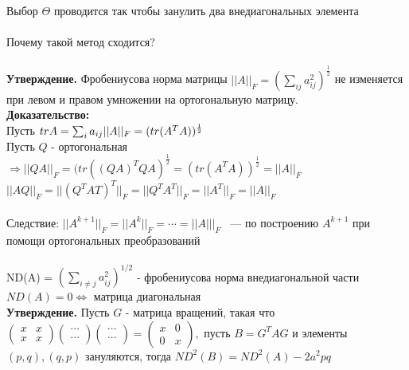     Выбор $\Theta$ проводится так чтобы занулить два внедиагональных элемента\\
    \\ 
    Почему такой метод сходится?\\ \\ 
\textbf{Утверждение.} Фробениусова норма матрицы \(||A||_F = (\sum_{ij}a_{ij}^2)^{\frac{1}{2}}\) не изменяется при левом и правом умножении на ортогональную матрицу. \\
    
    \textbf{Доказательство:} \\
    Пусть \(tr A = \sum_ia_{ij}\\
    ||A||_F = (tr(A^TA))^{\frac{1}{2}}\) \\
    Пусть \(Q\) - ортогональная \(\Rightarrow ||QA||_F=(tr((QA)^TQA)^{\frac{1}{2}} = (tr(A^TA))^{\frac{1}{2}} = ||A||_F\) \\
    \(||AQ||_F = ||(Q^{T}A{T})^{T}||_{F} = ||Q^{T}A^{T}||_{F} = ||A^{T}||_{F} = ||A||_F\) \\
    \\
    Следствие: \(||A^{k+1}||_F=||A^k||_F=\cdots=||A|||_F\) ~--- по построению \(A^{k+1}\) при помощи ортогональных преобразований \\
    \\
    ND(A) = \((\sum_{i \neq j}a_{ij}^2)^{1/2}\) - фробениусова норма внедиагональной части \\
    \(ND(A) = 0 \Leftrightarrow\) матрица диагональная \\

\textbf{Утверждение.} Пусть \(G\) - матрица вращений, такая что \(
    \begin{pmatrix}
      x & x \\ x & x   
    \end{pmatrix} 
    \begin{pmatrix}
        \cdots \\ \cdots
    \end{pmatrix}
    \begin{pmatrix}
        \cdots \\ \cdots
    \end{pmatrix} = 
    \begin{pmatrix}
      x & 0 \\ 0 & x   
    \end{pmatrix}, 
    \) пусть \(B = G^TAG\) и элементы \((p, q), (q, p)\) зануляются, тогда \(ND^2(B) = ND^2(A) - 2a^2pq\) \\

